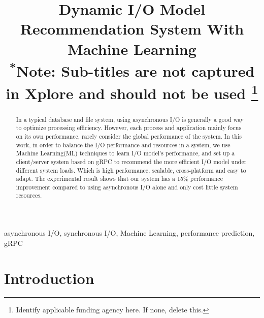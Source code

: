 \documentclass[conference]{IEEEtran}
\begin{document}
\title{Dynamic I/O Model Recommendation System With Machine Learning\\
{\footnotesize \textsuperscript{*}Note: Sub-titles are not captured in Xplore and
should not be used}
\thanks{Identify applicable funding agency here. If none, delete this.}
}

\author{
    \and
}

\maketitle

\begin{abstract}
    In a typical database and file system, using asynchronous I/O is generally a good way to optimize processing efficiency.
    However, each process and application mainly focus on its own performance, rarely consider the global performance of the system.
    In this work, in order to balance the I/O performance and resources in a system, we use Machine Learning(ML) techniques to learn I/O model's performance, 
    and set up a client/server system based on gRPC to recommend the more efficient I/O model under different system loads. Which is high performance, scalable, cross-platform and easy to adapt.
    The experimental result shows that our system has a 15\% performance improvement compared to using asynchronous I/O alone and only cost little system resources.

\end{abstract}

\renewcommand\IEEEkeywordsname{Keywords}
\begin{IEEEkeywords}
    asynchronous I/O, synchronous I/O, Machine Learning, performance prediction, gRPC 
\end{IEEEkeywords}

\section{Introduction}
\end{document}
